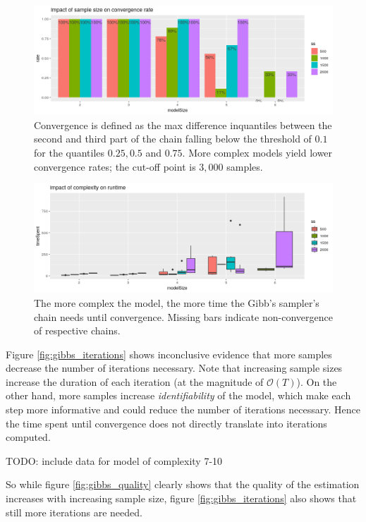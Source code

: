 \begin{figure}
	\includegraphics[width=\linewidth]{img/sim_bern_gibbs_convergence.png}
	\caption{Convergence is defined as the max difference inquantiles between the second and third part of the chain falling below the threshold of $0.1$ for the quantiles $0.25, 0.5$ and $0.75$. More complex models yield lower convergence rates; the cut-off point is $3,000$ samples. }
	\label{fig:gibbs_convergence}
\end{figure}


\begin{figure}
	\includegraphics[width=\linewidth]{img/sim_bern_gibbs_runtime.png}
	\caption{The more complex the model, the more time the Gibb's sampler's chain needs until convergence. Missing bars indicate non-convergence of respective chains. }
	\label{fig:gibbs_runtime}
\end{figure}


Figure \ref{fig:gibbs_iterations} shows inconclusive evidence that more samples decrease the number of iterations necessary. 
Note that increasing sample sizes increase the duration of each iteration (at the magnitude of $\mathcal{O}(T)$). On the other hand, more samples increase \textit{identifiability} of the model, which make each step more informative and could reduce the number of iterations necessary. Hence the time spent until convergence does not directly translate into iterations computed.

TODO: include data for model of complexity 7-10

So while figure \ref{fig:gibbs_quality} clearly shows that the quality of the estimation increases with increasing sample size, figure \ref{fig:gibbs_iterations} also shows that still more iterations are needed. 


